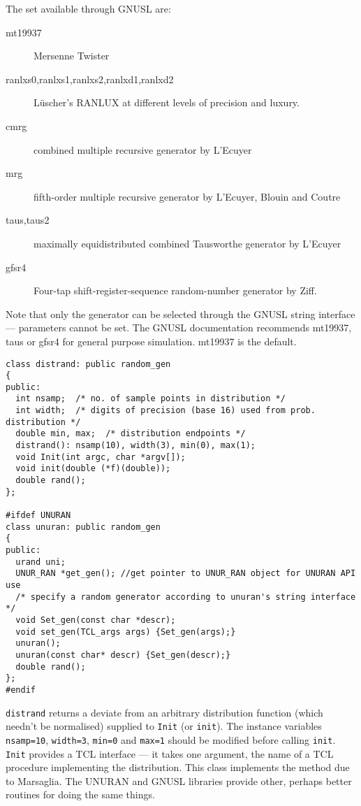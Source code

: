 The set available through GNUSL are:
\begin{description}
\item[mt19937] Mersenne Twister
\item[ranlxs0,ranlxs1,ranlxs2,ranlxd1,ranlxd2] L\"uscher's RANLUX at
  different levels of precision and luxury.
\item[cmrg] combined multiple recursive generator by L'Ecuyer
\item[mrg] fifth-order multiple recursive generator by L'Ecuyer,
  Blouin and Coutre
\item[taus,taus2] maximally equidistributed combined Tausworthe
  generator by L'Ecuyer
\item[gfsr4] Four-tap shift-register-sequence random-number generator
  by Ziff.
\end{description}
Note that only the generator can be selected through the GNUSL string
interface --- parameters cannot be set. The GNUSL documentation
recommends mt19937, taus or gfsr4 for general purpose
simulation. mt19937 is the default.

\begin{verbatim}
class distrand: public random_gen
{
public:
  int nsamp;  /* no. of sample points in distribution */
  int width;  /* digits of precision (base 16) used from prob. distribution */
  double min, max;  /* distribution endpoints */
  distrand(): nsamp(10), width(3), min(0), max(1);
  void Init(int argc, char *argv[]);
  void init(double (*f)(double));
  double rand();
};

#ifdef UNURAN
class unuran: public random_gen
{
public:
  urand uni;
  UNUR_RAN *get_gen(); //get pointer to UNUR_RAN object for UNURAN API use
  /* specify a random generator according to unuran's string interface */
  void Set_gen(const char *descr);
  void set_gen(TCL_args args) {Set_gen(args);}
  unuran();
  unuran(const char* descr) {Set_gen(descr);}
  double rand();
};
#endif
\end{verbatim}

\verb+distrand+ returns a deviate from an arbitrary
distribution function (which needn't be normalised) supplied to
\verb+Init+ (or \verb+init+). The instance variables \verb+nsamp=10+,
\verb+width=3+, \verb+min=0+ and \verb+max=1+ should be modified
before calling \verb+init+. \verb+Init+ provides a TCL interface ---
it takes one argument, the name of a TCL procedure implementing the
distribution. This class implements the method due to
Marsaglia\cite{Marsaglia63}. The UNURAN and GNUSL libraries provide
other, perhaps better routines for doing the same things.

